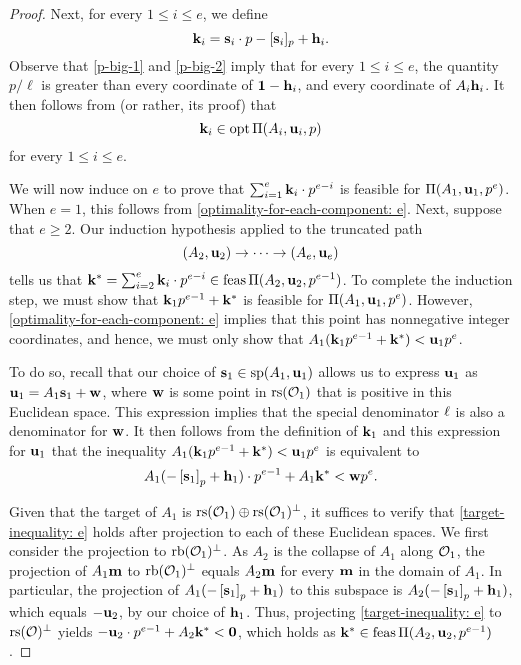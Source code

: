 \documentclass[11pt]{amsart}
\begin{document}
\begin{proof}
Next, for every $1 \leq i \leq e$,  we define
  \[
\mathbf{k}_i = \mathbf{s}_i \cdot p - [\mathbf{s}_i]_p + \mathbf{h}_i.
\]
Observe that \eqref{p-big-1} and \eqref{p-big-2} imply that for every $1 \leq i \leq e$, the quantity $p/\ell$ is greater than every coordinate of $\mathbf{1}-\mathbf{h}_i$, and every coordinate of $A_i \mathbf{h}_i$.  It then follows from  (or rather, its proof) that
\begin{equation}
\label{optimality-for-each-component: e}
\mathbf{k}_i \in \operatorname{opt} \Pi(A_i, \mathbf{u}_i,p)
\end{equation}
for every $1 \leq i \leq e$.

We will now induce on $e$ to prove that $\sum_{i=1}^e \mathbf{k}_i \cdot p^{e-i}$ is feasible for $\Pi(A_1, \mathbf{u}_1, p^e)$.  When $e = 1$, this follows from \eqref{optimality-for-each-component: e}.  Next, suppose that $e \geq 2$.  Our induction hypothesis applied to the truncated path
\[ (A_2, \mathbf{u}_2) \to \cdots \to (A_e, \mathbf{u}_e) \]
%
tells us that $\mathbf{k}^{\ast} = \sum_{i=2}^e \mathbf{k}_i \cdot p^{e-i} \in \operatorname{feas} \Pi(A_2, \mathbf{u}_2, p^{e-1})$.  To complete the induction step, we must show that $\mathbf{k}_1 p^{e-1} + \mathbf{k}^{\ast}$ is feasible for $\Pi(A_1, \mathbf{u}_1, p^e)$.  However,  \eqref{optimality-for-each-component: e} implies that this point has nonnegative integer coordinates, and hence, we must only show that $A_1 ( \mathbf{k}_1 p^{e-1} + \mathbf{k}^{\ast} ) < \mathbf{u}_1 p^e$.

To do so,  recall that our choice of $\mathbf{s}_1 \in \operatorname{sp}(A_1, \mathbf{u}_1)$ allows us to express $\mathbf{u}_1$ as
$\mathbf{u}_1 = A_1 \mathbf{s}_1 + \mathbf{w}$, where $\mathbf{w}$ is some point in $\operatorname{rs}(\mathcal{O}_1)$ that is positive in this Euclidean space.  This expression implies that the special denominator $\ell$ is also a denominator for $\mathbf{w}$.  It then follows from the definition of $\mathbf{k}_1$ and this expression for $\mathbf{u}_1$ that the inequality $A_1 ( \mathbf{k}_1 p^{e-1} + \mathbf{k}^{\ast} ) < \mathbf{u}_1 p^e$ is equivalent to
%
\begin{equation}
\label{target-inequality: e}
  A_1( - \left[ \mathbf{s}_1 \right]_p + \mathbf{h}_1 ) \cdot p^{e-1} + A_1\mathbf{k}^{\ast} < \mathbf{w} p^e.
\end{equation}

Given that the target of $A_1$ is $\operatorname{rs}(\mathcal{O}_1) \oplus \operatorname{rs}(\mathcal{O}_1)^{\perp}$, it suffices to verify that \eqref{target-inequality: e} holds after projection to each of these Euclidean spaces.  We first consider the projection to $\operatorname{rb}(\mathcal{O}_1)^{\perp}$.  As $A_2$ is the collapse of $A_1$ along $\mathcal{O}_1$, the projection of $A_1 \mathbf{m}$ to $\operatorname{rb}(\mathcal{O}_1)^{\perp}$ equals $A_2 \mathbf{m}$ for every $\mathbf{m}$ in the domain of $A_1$.  In particular, the projection of $A_1( - \left[ \mathbf{s}_1 \right]_p + \mathbf{h}_1 )$ to this subspace is $A_2 ( - \left[ \mathbf{s}_1 \right]_p + \mathbf{h}_1 )$, which equals $-\mathbf{u}_2$, by our choice of $\mathbf{h}_1$.  Thus, projecting \eqref{target-inequality: e} to $\operatorname{rs}(\mathcal{O})^{\perp}$ yields $-\mathbf{u}_2 \cdot p^{e-1} + A_2 \mathbf{k}^{\ast} < \mathbf{0}$, which holds as $\mathbf{k}^{\ast} \in \operatorname{feas} \Pi(A_2, \mathbf{u}_2, p^{e-1})$.


\end{proof}
\end{document}
